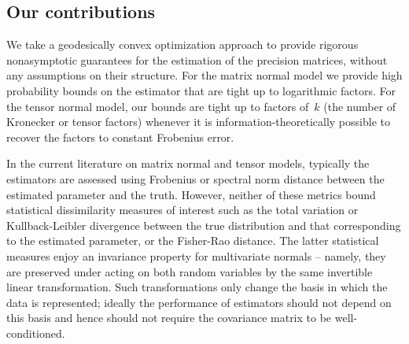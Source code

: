 \documentclass[aos]{imsart}
\theoremstyle{definition}
\numberwithin{equation}{section}
\begin{document}
\subsection{Our contributions}
We take a geodesically convex optimization approach to provide rigorous nonasymptotic guarantees for the estimation of the precision matrices, without any assumptions on their structure.
For the matrix normal model we provide high probability bounds on the estimator that are tight up to logarithmic factors.
For the tensor normal model, our bounds are tight up to factors of~$k$ (the number of Kronecker or tensor factors) whenever it is information-theoretically possible to recover the factors to constant Frobenius error.


In the current literature on matrix normal and tensor models, typically the estimators are assessed using Frobenius or spectral norm distance between the estimated parameter and the truth.
However, neither of these metrics bound statistical dissimilarity measures of interest such as the total variation or Kullback-Leibler divergence between the true distribution and that corresponding to the estimated parameter, or the Fisher-Rao distance.
The latter statistical measures enjoy an invariance property for multivariate normals -- namely, they are preserved under acting on both random variables by the same invertible linear transformation.
Such transformations only change the basis in which the data is represented; ideally the performance of estimators should not depend on this basis and hence should not require the covariance matrix to be well-conditioned.
\end{document}
